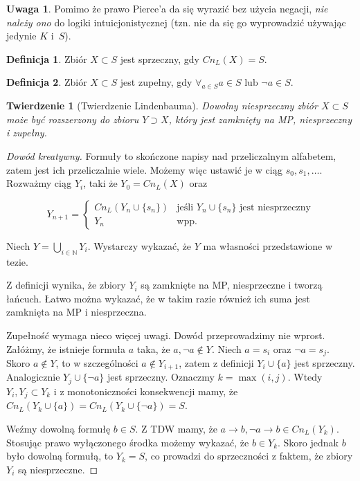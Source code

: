 \documentclass[10pt,a4paper]{article}
\theoremstyle{plain}
\newtheorem{theorem}{Twierdzenie}
\theoremstyle{definition}
\newtheorem*{definition}{Definicja}
\newtheorem*{remark}{Uwaga}
\newcommand{\impl}{\rightarrow}
\newcommand{\N}{\mathbb{N}}
\begin{document}
\begin{remark}
  Pomimo że prawo Pierce'a da się wyrazić bez użycia negacji,
  \emph{nie należy ono} do logiki intuicjonistycznej (tzn.
  nie da się go wyprowadzić używając jedynie $K$ i~$S$).
\end{remark}

\begin{definition}
Zbiór $X \subset S$ jest sprzeczny, gdy $Cn_L(X) = S$.
\end{definition}

\begin{definition}
Zbiór $X \subset S$ jest zupełny, gdy 
$\forall_{a \in S} a \in S \text{ lub } \neg a \in S$.
\end{definition}

\begin{theorem}[Twierdzenie Lindenbauma]
Dowolny niesprzeczny zbiór $X \subset S$ może być rozszerzony do zbioru
$Y \supset X$, który jest zamknięty na MP, niesprzeczny i zupełny.
\end{theorem}

\begin{proof}[Dowód kreatywny]
Formuły to skończone napisy nad przeliczalnym alfabetem, zatem jest ich
przeliczalnie wiele. Możemy więc ustawić je w ciąg $s_0, s_1, \ldots$. 
Rozważmy ciąg $Y_i$, taki że $Y_0 = Cn_L(X)$ oraz

$$Y_{n+1} = \begin{cases}
  Cn_L(Y_n \cup \{s_n\}) & 
    \text{jeśli } Y_n \cup \{s_n\} \text{ jest niesprzeczny}\\
  Y_n & \text{wpp.}
\end{cases}$$

Niech $Y = \bigcup_{i\in\N} Y_i$. Wystarczy wykazać, że $Y$ ma własności
przedstawione w tezie.

Z definicji wynika, że zbiory $Y_i$ są zamknięte na MP, niesprzeczne 
i tworzą łańcuch. Łatwo można wykazać, że w takim razie również ich
suma jest zamknięta na MP i niesprzeczna.

Zupełność wymaga nieco więcej uwagi. Dowód przeprowadzimy nie wprost.
Załóżmy, że istnieje formuła $a$ taka, że $a, \neg a \not \in Y$.
Niech $a = s_i$ oraz $\neg a = s_j$. Skoro $a \not \in Y$, to
w szczególności $a \not \in Y_{i+1}$, zatem z definicji $Y_i \cup \{a\}$
jest sprzeczny. Analogicznie $Y_j \cup \{\neg a\}$ jest sprzeczny.
Oznaczmy $k=\max(i, j)$. Wtedy $Y_i,Y_j \subset Y_k$ i z monotoniczności
konsekwencji mamy, że $Cn_L(Y_k \cup \{a\}) = Cn_L(Y_k \cup \{\neg a\}) = S$.

Weźmy dowolną formułę $b \in S$. Z TDW mamy, że
$a \impl b, \neg a \impl b \in Cn_L(Y_k)$. Stosując prawo wyłączonego środka
możemy wykazać, że $b \in Y_k$. Skoro jednak $b$ było dowolną formułą, to
$Y_k = S$, co prowadzi do sprzeczności z faktem, że zbiory $Y_i$ są
niesprzeczne.
\end{proof}
\end{document}
